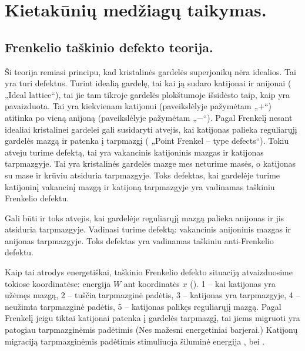 \chapter{Kietakūnių medžiagų taikymas.}


\section{Frenkelio taškinio defekto teorija.}

Ši teorija remiasi principu, kad kristalinės gardelės superjonikų
nėra idealios. Tai yra turi defektus. Turint idealią gardelę, tai
kai ją sudaro katijonai ir anijonai ( „Ideal lattice“),
tai jie tam tikroje gardelės plokštumoje išsidėsto taip, kaip
yra pavaizduota. Tai yra kiekvienam katijonui (paveikslėlyje pažymėtam
„$+$“) atitinka po vieną anijoną (paveikslėlyje pažymėtam „$-$“).
Pagal Frenkelį nesant idealiai kristalinei gardelei
gali susidaryti atvejis, kai katijonas palieka reguliarųjį gardelės
mazgą ir patenka į tarpmazgį ( „Point Frenkel – type defects“).
Tokiu atveju turime defektą, tai yra vakancinis katijoninis mazgas
ir katijonas tarpmazgyje. Tai yra kristalinės gardelės mazge mes
neturime masės, o katijonas su mase ir krūviu atsiduria tarpmazgyje.
Toks defektas, kai gardelėje turime katijoninį vakancinį mazgą
ir katijoną tarpmazgyje yra vadinamas taškiniu Frenkelio defektu.

Gali būti ir toks atvejis, kai gardelėje reguliarųjį mazgą palieka
anijonas ir jis atsiduria tarpmazgyje. Vadinasi turime defektą:
vakancinis anijoninis mazgas ir anijonas tarpmazgyje. Toks defektas
yra vadinamas taškiniu anti-Frenkelio defektu.

Kaip tai atrodys energetiškai, taškinio Frenkelio defekto situaciją
atvaizduosime tokiose koordinatėse: energija $W$ ant koordinatės $x$
(). 1 – kai katijonas yra užėmęs mazgą, 2 – tuščia
tarpmazginė padėtis, 3 – katijonas yra tarpmazgyje, 4 – neužimta
tarpmazginė padėtis, 5 – katijonas palikęs reguliarųjį mazgą.
Pagal Frenkelį jeigu tiktai katijonai patenka į gardelės tarpmazgį,
tai jiems migruoti yra patogiau tarpmazginėmis padėtimis (Nes
mažesni energetiniai barjerai.) Katijonų migraciją tarpmazginėmis
padėtimis stimuliuoja šiluminė energija ,
bei .

